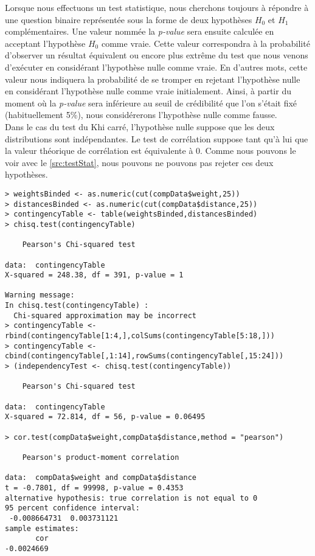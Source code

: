 \noindent 
Lorsque nous effectuons un test statistique, nous cherchons toujours à répondre à une question binaire représentée sous la forme de deux hypothèses $H_0$ et $H_1$ complémentaires. Une valeur nommée la \emph{p-value} sera ensuite calculée en acceptant l'hypothèse $H_0$ comme vraie. Cette valeur correspondra à la probabilité d'observer un résultat équivalent ou encore plus extrême du test que nous venons d'exécuter en considérant l'hypothèse nulle comme vraie. En d'autres mots, cette valeur nous indiquera la probabilité de se tromper en rejetant l'hypothèse nulle en considérant l'hypothèse nulle comme vraie initialement. Ainsi, à partir du moment où la \emph{p-value} sera inférieure au seuil de crédibilité que l'on s'était fixé (habituellement 5\%), nous considérerons l'hypothèse nulle comme fausse. \\ 

\noindent
Dans le cas du test du Khi carré, l'hypothèse nulle suppose que les deux distributions sont indépendantes. Le test de corrélation suppose tant qu'à lui que la valeur théorique de corrélation est équivalente à 0. Comme nous pouvons le voir avec le \autoref{src:testStat}, nous pouvons ne pouvons pas rejeter ces deux hypothèses. \\

\begin{lstlisting}[caption = Tests d'indépendance et de corrélation entre distributions,label=src:testStat]
> weightsBinded <- as.numeric(cut(compData$weight,25))
> distancesBinded <- as.numeric(cut(compData$distance,25))
> contingencyTable <- table(weightsBinded,distancesBinded)
> chisq.test(contingencyTable)

	Pearson's Chi-squared test

data:  contingencyTable
X-squared = 248.38, df = 391, p-value = 1

Warning message:
In chisq.test(contingencyTable) :
  Chi-squared approximation may be incorrect
> contingencyTable <- rbind(contingencyTable[1:4,],colSums(contingencyTable[5:18,]))
> contingencyTable <- cbind(contingencyTable[,1:14],rowSums(contingencyTable[,15:24]))
> (independencyTest <- chisq.test(contingencyTable))

	Pearson's Chi-squared test

data:  contingencyTable
X-squared = 72.814, df = 56, p-value = 0.06495

> cor.test(compData$weight,compData$distance,method = "pearson")

	Pearson's product-moment correlation

data:  compData$weight and compData$distance
t = -0.7801, df = 99998, p-value = 0.4353
alternative hypothesis: true correlation is not equal to 0
95 percent confidence interval:
 -0.008664731  0.003731121
sample estimates:
       cor 
-0.0024669 
\end{lstlisting}

